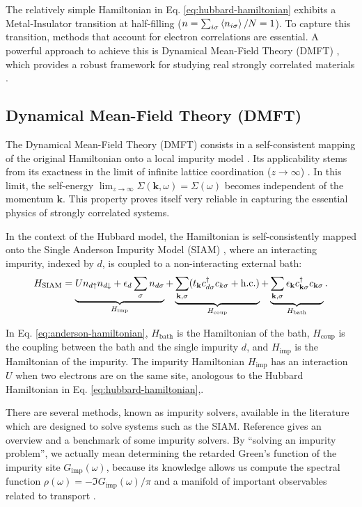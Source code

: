 \documentclass[12pt]{report}
\begin{document}
The relatively simple Hamiltonian in Eq. \eqref{eq:hubbard-hamiltonian} exhibits a Metal-Insulator transition at half-filling ($n = \sum_{i\sigma} \ev{n_{i\sigma}} / N = 1$). To capture this transition, methods that account for electron correlations are essential. A powerful approach to achieve this is Dynamical Mean-Field Theory (DMFT) \cite{georges1996}, which provides a robust framework for studying real strongly correlated materials \cite{haule_real_materials}.

\subsection{Dynamical Mean-Field Theory (DMFT)} \label{sec:dmft}

The Dynamical Mean-Field Theory (DMFT) consists in a self-consistent mapping of the original Hamiltonian onto a local impurity model \cite{thesis_dmft_graz}. Its applicability stems from its exactness in the limit of infinite lattice coordination ($z \to \infty$) \cite{georges1996}. In this limit, the self-energy $\displaystyle{\lim_{z \to \infty}\Sigma(\mathbf{k},\omega) = \Sigma(\omega)}$ becomes independent of the momentum $\mathbf{k}$. This property proves itself very reliable in capturing the essential physics of strongly correlated systems.

In the context of the Hubbard model, the Hamiltonian is self-consistently mapped onto the Single Anderson Impurity Model (SIAM) \cite{impurity-solvers, georges1996}, where an interacting impurity, indexed by $d$, is coupled to a non-interacting external bath:
\begin{equation} \label{eq:anderson-hamiltonian}
H_{\text{SIAM}} = \underbrace{U n_{d{\uparrow}} n_{d{\downarrow}} + \epsilon_d \sum_{{\sigma}} n_{d{\sigma}}}_{H_{\text{imp}}}
+ \underbrace{\sum_{{\vb{k}},{\sigma}} (t_{\vb{k}} c_{d{\sigma}}^\dagger c_{k{\sigma}} + {\text{h.c.}})}_{H_{\text{coup}}}
+ \underbrace{\sum_{{\vb{k}},{\sigma}} \epsilon_{\vb{k}} c_{{\vb{k}}{\sigma}}^\dagger c_{{\vb{k}}{\sigma}}}_{H_{\text{bath}}}.
\end{equation}

In Eq. \eqref{eq:anderson-hamiltonian}, $H_{\text{bath}}$ is the Hamiltonian of the bath, $H_{\text{coup}}$ is the coupling between the bath and the single impurity $d$, and $H_{\text{imp}}$ is the Hamiltonian of the impurity. The impurity Hamiltonian $H_{\text{imp}}$  has an interaction $U$ when two electrons are on the same site, anologous to the Hubbard Hamiltonian in Eq. \eqref{eq:hubbard-hamiltonian},.

There are several methods, known as impurity solvers, available in the literature which are designed to solve systems such as the SIAM. Reference \cite{impurity-solvers} gives an overview and a benchmark of some impurity solvers. By ``solving an impurity problem'', we actually mean determining the retarded Green's function of the impurity site $G_{\text{imp}}(\omega)$, because its knowledge allows us compute the spectral function $\displaystyle{\rho(\omega) = - \Im{G_{\text{imp}}(\omega)}} / \pi$ and a manifold of important observables related to transport \cite{pedagogical-gfs}.
\end{document}
